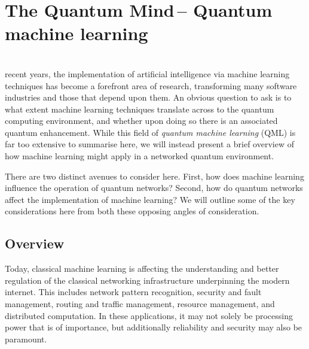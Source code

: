%
%

\section{The Quantum Mind\texttrademark\,-- Quantum machine learning}\label{sec:quantum_mind}

\newline


  
\\

 recent years, the implementation of artificial intelligence via machine learning techniques has become a forefront area of research, transforming many software industries and those that depend upon them. An obvious question to ask is to what extent machine learning techniques translate across to the quantum computing environment, and whether upon doing so there is an associated quantum enhancement. While this field of \textit{quantum machine learning} (QML) is far too extensive to summarise here, we will instead present a brief overview of how machine learning might apply in a networked quantum environment.

There are two distinct avenues to consider here. First, how does machine learning influence the operation of quantum networks? Second, how do quantum networks affect the implementation of machine learning? We will outline some of the key considerations here from both these opposing angles of consideration.

\subsection{Overview}

Today, classical machine learning is affecting the understanding and better regulation of the classical networking infrastructure underpinning the modern internet. This includes network pattern recognition, security and fault management, routing and traffic management, resource management, and distributed computation. In these applications, it may not solely be processing power that is of importance, but additionally reliability and security may also be paramount.

